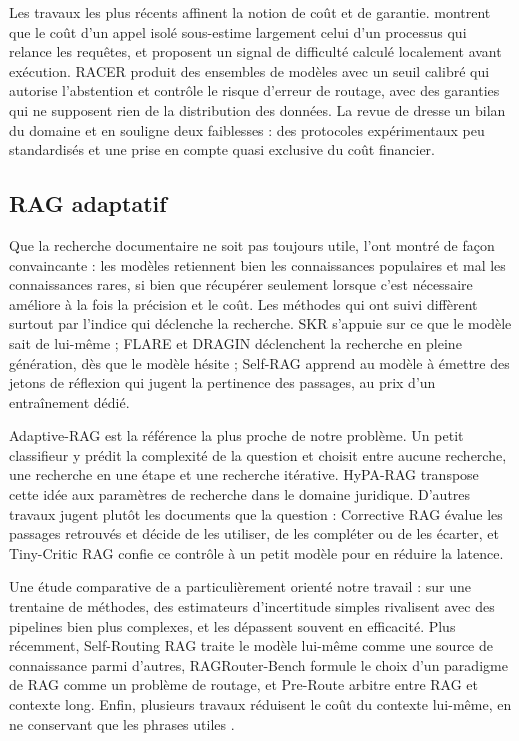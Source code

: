 \documentclass[11pt,a4paper]{article}
\begin{document}
Les travaux les plus récents affinent la notion de coût et de garantie. \citet{fu2026inflation}
montrent que le coût d'un appel isolé sous-estime largement celui d'un processus qui relance les
requêtes, et proposent un signal de difficulté calculé localement avant exécution. RACER
\citep{hao2026racer} produit des ensembles de modèles avec un seuil calibré qui autorise l'abstention et
contrôle le risque d'erreur de routage, avec des garanties qui ne supposent rien de la distribution des
données. La revue de \citet{varangot2025survey} dresse un bilan du domaine et en souligne deux faiblesses
: des protocoles expérimentaux peu standardisés et une prise en compte quasi exclusive du coût
financier.

\subsection{RAG adaptatif}

Que la recherche documentaire ne soit pas toujours utile, \citet{mallen2022trust} l'ont montré de façon
convaincante : les modèles retiennent bien les connaissances populaires et mal les connaissances rares,
si bien que récupérer seulement lorsque c'est nécessaire améliore à la fois la précision et le coût. Les
méthodes qui ont suivi diffèrent surtout par l'indice qui déclenche la recherche. SKR
\citep{wang2023skr} s'appuie sur ce que le modèle sait de lui-même ; FLARE \citep{jiang2023flare} et
DRAGIN \citep{su2024dragin} déclenchent la recherche en pleine génération, dès que le modèle hésite ;
Self-RAG \citep{asai2023selfrag} apprend au modèle à émettre des jetons de réflexion qui jugent la
pertinence des passages, au prix d'un entraînement dédié.

Adaptive-RAG \citep{jeong2024adaptiverag} est la référence la plus proche de notre problème. Un petit
classifieur y prédit la complexité de la question et choisit entre aucune recherche, une recherche en
une étape et une recherche itérative. HyPA-RAG \citep{kalra2024hyparag} transpose cette idée aux
paramètres de recherche dans le domaine juridique. D'autres travaux jugent plutôt les documents que la
question : Corrective RAG \citep{yan2024crag} évalue les passages retrouvés et décide de les utiliser,
de les compléter ou de les écarter, et Tiny-Critic RAG \citep{wu2026tinycritic} confie ce contrôle à un
petit modèle pour en réduire la latence.

Une étude comparative de \citet{moskvoretskii2025adaptive} a particulièrement orienté notre travail : sur
une trentaine de méthodes, des estimateurs d'incertitude simples rivalisent avec des pipelines bien plus
complexes, et les dépassent souvent en efficacité. Plus récemment, Self-Routing RAG \citep{wu2025srrag}
traite le modèle lui-même comme une source de connaissance parmi d'autres, RAGRouter-Bench
\citep{wang2026ragrouterbench} formule le choix d'un paradigme de RAG comme un problème de routage, et
Pre-Route \citep{chen2026preroute} arbitre entre RAG et contexte long. Enfin, plusieurs travaux
réduisent le coût du contexte lui-même, en ne conservant que les phrases utiles
\citep{arefeen2024leancontext,akesson2024clustered,chen2026logicrag}.
\end{document}
